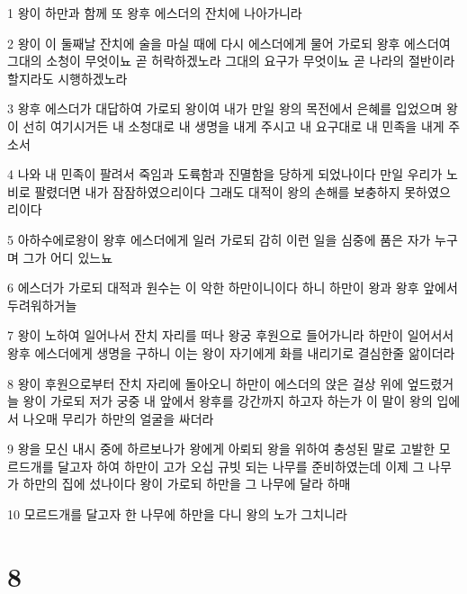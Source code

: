 \par 1 왕이 하만과 함께 또 왕후 에스더의 잔치에 나아가니라
\par 2 왕이 이 둘째날 잔치에 술을 마실 때에 다시 에스더에게 물어 가로되 왕후 에스더여 그대의 소청이 무엇이뇨 곧 허락하겠노라 그대의 요구가 무엇이뇨 곧 나라의 절반이라 할지라도 시행하겠노라
\par 3 왕후 에스더가 대답하여 가로되 왕이여 내가 만일 왕의 목전에서 은혜를 입었으며 왕이 선히 여기시거든 내 소청대로 내 생명을 내게 주시고 내 요구대로 내 민족을 내게 주소서
\par 4 나와 내 민족이 팔려서 죽임과 도륙함과 진멸함을 당하게 되었나이다 만일 우리가 노비로 팔렸더면 내가 잠잠하였으리이다 그래도 대적이 왕의 손해를 보충하지 못하였으리이다
\par 5 아하수에로왕이 왕후 에스더에게 일러 가로되 감히 이런 일을 심중에 품은 자가 누구며 그가 어디 있느뇨
\par 6 에스더가 가로되 대적과 원수는 이 악한 하만이니이다 하니 하만이 왕과 왕후 앞에서 두려워하거늘
\par 7 왕이 노하여 일어나서 잔치 자리를 떠나 왕궁 후원으로 들어가니라 하만이 일어서서 왕후 에스더에게 생명을 구하니 이는 왕이 자기에게 화를 내리기로 결심한줄 앎이더라
\par 8 왕이 후원으로부터 잔치 자리에 돌아오니 하만이 에스더의 앉은 걸상 위에 엎드렸거늘 왕이 가로되 저가 궁중 내 앞에서 왕후를 강간까지 하고자 하는가 이 말이 왕의 입에서 나오매 무리가 하만의 얼굴을 싸더라
\par 9 왕을 모신 내시 중에 하르보나가 왕에게 아뢰되 왕을 위하여 충성된 말로 고발한 모르드개를 달고자 하여 하만이 고가 오십 규빗 되는 나무를 준비하였는데 이제 그 나무가 하만의 집에 섰나이다 왕이 가로되 하만을 그 나무에 달라 하매
\par 10 모르드개를 달고자 한 나무에 하만을 다니 왕의 노가 그치니라

\chapter{8}

